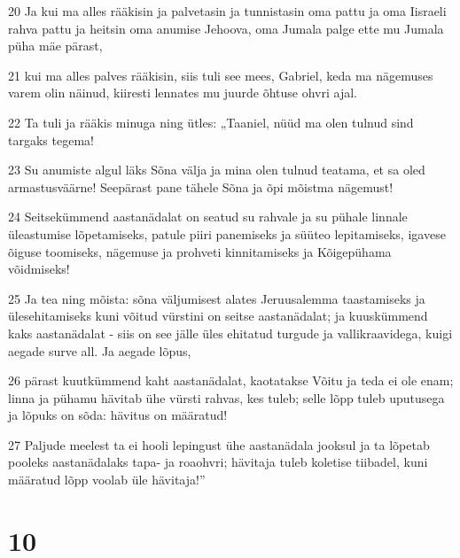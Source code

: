 \par 20 Ja kui ma alles rääkisin ja palvetasin ja tunnistasin oma pattu ja oma Iisraeli rahva pattu ja heitsin oma anumise Jehoova, oma Jumala palge ette mu Jumala püha mäe pärast,
\par 21 kui ma alles palves rääkisin, siis tuli see mees, Gabriel, keda ma nägemuses varem olin näinud, kiiresti lennates mu juurde õhtuse ohvri ajal.
\par 22 Ta tuli ja rääkis minuga ning ütles: „Taaniel, nüüd ma olen tulnud sind targaks tegema!
\par 23 Su anumiste algul läks Sõna välja ja mina olen tulnud teatama, et sa oled armastusväärne! Seepärast pane tähele Sõna ja õpi mõistma nägemust!
\par 24 Seitsekümmend aastanädalat on seatud su rahvale ja su pühale linnale üleastumise lõpetamiseks, patule piiri panemiseks ja süüteo lepitamiseks, igavese õiguse toomiseks, nägemuse ja prohveti kinnitamiseks ja Kõigepühama võidmiseks!
\par 25 Ja tea ning mõista: sõna väljumisest alates Jeruusalemma taastamiseks ja ülesehitamiseks kuni võitud vürstini on seitse aastanädalat; ja kuuskümmend kaks aastanädalat - siis on see jälle üles ehitatud turgude ja vallikraavidega, kuigi aegade surve all. Ja aegade lõpus,
\par 26 pärast kuutkümmend kaht aastanädalat, kaotatakse Võitu ja teda ei ole enam; linna ja pühamu hävitab ühe vürsti rahvas, kes tuleb; selle lõpp tuleb uputusega ja lõpuks on sõda: hävitus on määratud!
\par 27 Paljude meelest ta ei hooli lepingust ühe aastanädala jooksul ja ta lõpetab pooleks aastanädalaks tapa- ja roaohvri; hävitaja tuleb koletise tiibadel, kuni määratud lõpp voolab üle hävitaja!”

\chapter{10}

